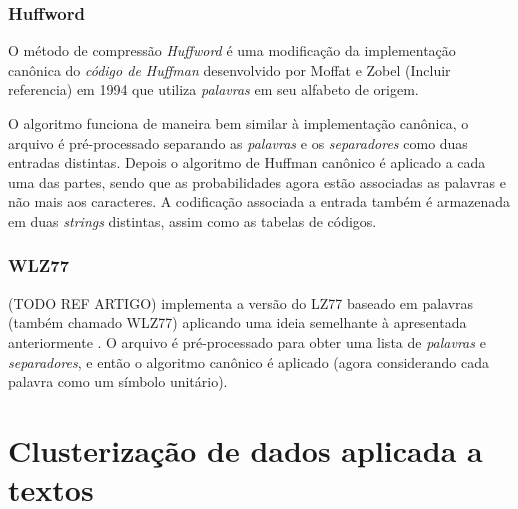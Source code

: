 \subsection{Huffword}
O método de compressão \emph{Huffword} é uma modificação da implementação canônica do \emph{código de Huffman} desenvolvido por Moffat e Zobel (Incluir referencia) em 1994 que utiliza \emph{palavras} em seu alfabeto de origem.

O algoritmo funciona de maneira bem similar à implementação canônica, o arquivo é pré-processado separando as \emph{palavras} e os \emph{separadores} como duas entradas distintas.
Depois o algoritmo de Huffman canônico é aplicado a cada uma das partes, sendo que as probabilidades agora estão associadas as palavras e não mais aos caracteres. 
A codificação associada a entrada também é armazenada em duas \emph{strings} distintas, assim como as tabelas de códigos.
 
 \subsection{WLZ77}
 (TODO REF ARTIGO) implementa a versão do LZ77 baseado em palavras (também chamado WLZ77) aplicando uma ideia semelhante à apresentada anteriormente . 
 O arquivo é pré-processado para obter uma lista de \emph{palavras} e \emph{separadores}, e então o algoritmo canônico é aplicado (agora considerando cada palavra como um símbolo unitário).
 
 \chapter{Clusterização de dados aplicada a textos}


